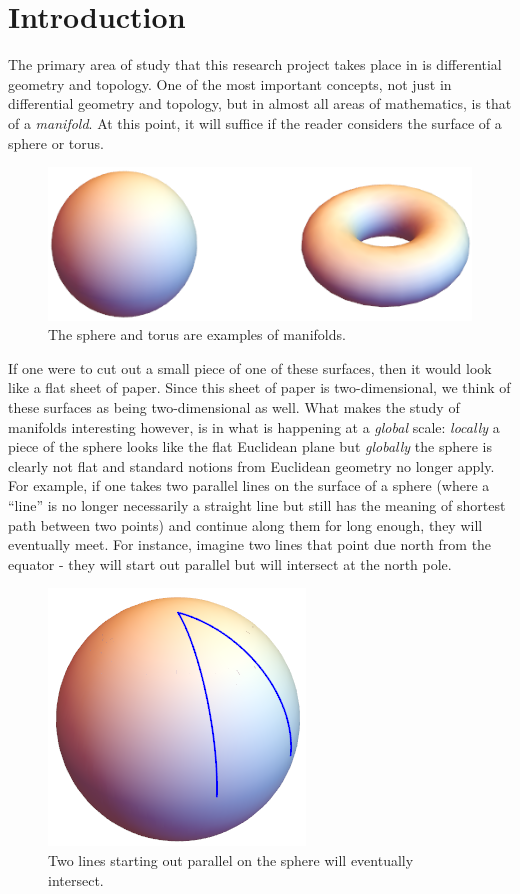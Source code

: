 \section{Introduction}
The primary area of study that this research project takes place in is differential geometry and topology. One of the most important concepts, not just in differential geometry and topology, but in almost all areas of mathematics, is that of a \textit{manifold}. At this point, it will suffice if the reader considers the surface of a sphere or torus.\\

\begin{figure}[h!]
\centering
\includegraphics[scale=0.675]{fig/fig1a}
\caption{The sphere and torus are examples of manifolds.}
\end{figure}

If one were to cut out a small piece of one of these surfaces, then it would look like a flat sheet of paper. Since this sheet of paper is two-dimensional, we think of these surfaces as being two-dimensional as well. What makes the study of manifolds interesting however, is in what is happening at a \textit{global} scale: \textit{locally} a piece of the sphere looks like the flat Euclidean plane but \textit{globally} the sphere is clearly not flat and standard notions from Euclidean geometry no longer apply. For example, if one takes two parallel lines on the surface of a sphere (where a ``line'' is no longer necessarily a straight line but still has the meaning of shortest path between two points) and continue along them for long enough, they will eventually meet. For instance, imagine two lines that point due north from the equator - they will start out parallel but will intersect at the north pole.\\

\begin{figure}[h!]
\centering
\includegraphics[scale=0.675]{fig/fig2a}
\caption{Two lines starting out parallel on the sphere will eventually intersect.}
\end{figure}

